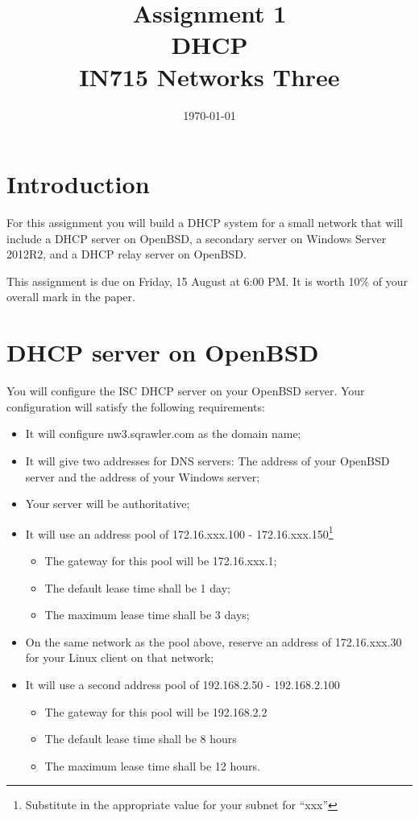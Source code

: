 \documentclass{article}
\begin{document}
\title{ Assignment 1 \\ DHCP \\ IN715 Networks Three}
\date{\today}
\maketitle

\section*{Introduction}
For this assignment you will build a DHCP system for a small network that will include a DHCP server on OpenBSD, a secondary server on Windows Server 2012R2, and a DHCP relay server on OpenBSD.

This assignment is due on Friday, 15 August at 6:00 PM.  It is worth 10\% of your overall mark in the paper.

\section{DHCP server on OpenBSD}
You will configure the ISC DHCP server on your OpenBSD server.  Your configuration will satisfy the following requirements:

\begin{itemize}
  \item It will configure nw3.sqrawler.com as the domain name;
  \item It will give two addresses for DNS servers: The address of your OpenBSD server and the address of your Windows server;
  \item Your server will be authoritative;
  \item It will use an address pool of 172.16.xxx.100 - 172.16.xxx.150\footnote{Substitute in the appropriate value for your subnet for ``xxx''}
    \begin{itemize}
      \item The gateway for this pool will be 172.16.xxx.1;
      \item The default lease time shall be 1 day;
      \item The maximum lease time shall be 3 days;
    \end{itemize}
  \item On the same network as the pool above, reserve an address of
        172.16.xxx.30 for your Linux client on that network;
  \item It will use a second  address pool of 192.168.2.50 - 192.168.2.100
    \begin{itemize}
      \item The gateway for this pool will be 192.168.2.2
      \item The default lease time shall be 8 hours
      \item The maximum lease time shall be 12 hours.
    \end{itemize}
\end{itemize}
\end{document}
